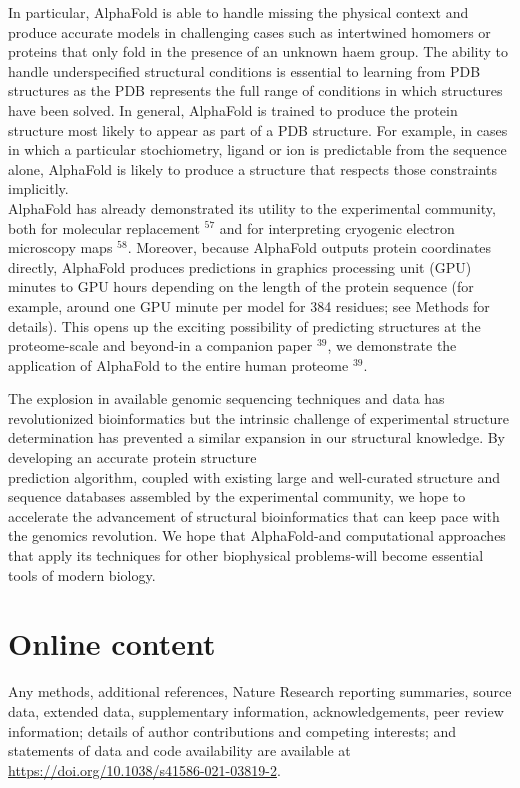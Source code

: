 \documentclass[10pt]{article}
\begin{document}
In particular, AlphaFold is able to handle missing the physical context and produce accurate models in challenging cases such as intertwined homomers or proteins that only fold in the presence of an unknown haem group. The ability to handle underspecified structural conditions is essential to learning from PDB structures as the PDB represents the full range of conditions in which structures have been solved. In general, AlphaFold is trained to produce the protein structure most likely to appear as part of a PDB structure. For example, in cases in which a particular stochiometry, ligand or ion is predictable from the sequence alone, AlphaFold is likely to produce a structure that respects those constraints implicitly.\\
AlphaFold has already demonstrated its utility to the experimental community, both for molecular replacement ${ }^{57}$ and for interpreting cryogenic electron microscopy maps ${ }^{58}$. Moreover, because AlphaFold outputs protein coordinates directly, AlphaFold produces predictions in graphics processing unit (GPU) minutes to GPU hours depending on the length of the protein sequence (for example, around one GPU minute per model for 384 residues; see Methods for details). This opens up the exciting possibility of predicting structures at the proteome-scale and beyond-in a companion paper ${ }^{39}$, we demonstrate the application of AlphaFold to the entire human proteome ${ }^{39}$.

The explosion in available genomic sequencing techniques and data has revolutionized bioinformatics but the intrinsic challenge of experimental structure determination has prevented a similar expansion in our structural knowledge. By developing an accurate protein structure\\
prediction algorithm, coupled with existing large and well-curated structure and sequence databases assembled by the experimental community, we hope to accelerate the advancement of structural bioinformatics that can keep pace with the genomics revolution. We hope that AlphaFold-and computational approaches that apply its techniques for other biophysical problems-will become essential tools of modern biology.

\section*{Online content}
Any methods, additional references, Nature Research reporting summaries, source data, extended data, supplementary information, acknowledgements, peer review information; details of author contributions and competing interests; and statements of data and code availability are available at \href{https://doi.org/10.1038/s41586-021-03819-2}{https://doi.org/10.1038/s41586-021-03819-2}.
\end{document}
